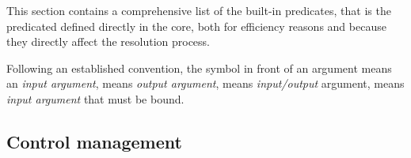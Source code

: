 This section contains a comprehensive list of the built-in predicates, that is the predicated defined directly in the \tuprolog{} core, both for efficiency reasons and because they directly affect the resolution process.

Following an established convention, the symbol \bt{+} in front of an argument means an \emph{input argument}, \bt{-} means \emph{output argument},  means \emph{input/output} argument,  means \emph{input argument} that must be bound.

\subsection{Control management}
\label{ssec:control-management}

